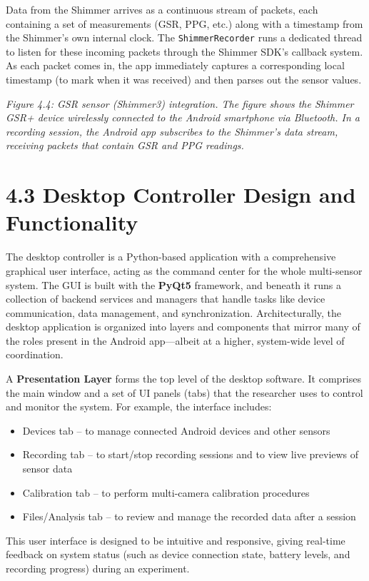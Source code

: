 Data from the Shimmer arrives as a continuous stream of packets, each containing a set of measurements (GSR, PPG, etc.) along with a timestamp from the Shimmer's own internal clock. The \texttt{ShimmerRecorder} runs a dedicated thread to listen for these incoming packets through the Shimmer SDK's callback system. As each packet comes in, the app immediately captures a corresponding local timestamp (to mark when it was received) and then parses out the sensor values.

\textit{Figure 4.4: GSR sensor (Shimmer3) integration. The figure shows the Shimmer GSR+ device wirelessly connected to the Android smartphone via Bluetooth. In a recording session, the Android app subscribes to the Shimmer's data stream, receiving packets that contain GSR and PPG readings.}

\section{4.3 Desktop Controller Design and Functionality}

The desktop controller is a Python-based application with a comprehensive graphical user interface, acting as the command center for the whole multi-sensor system. The GUI is built with the \textbf{PyQt5} framework, and beneath it runs a collection of backend services and managers that handle tasks like device communication, data management, and synchronization. Architecturally, the desktop application is organized into layers and components that mirror many of the roles present in the Android app—albeit at a higher, system-wide level of coordination.

A \textbf{Presentation Layer} forms the top level of the desktop software. It comprises the main window and a set of UI panels (tabs) that the researcher uses to control and monitor the system. For example, the interface includes:
\begin{itemize}
\item Devices tab – to manage connected Android devices and other sensors
\item Recording tab – to start/stop recording sessions and to view live previews of sensor data
\item Calibration tab – to perform multi-camera calibration procedures
\item Files/Analysis tab – to review and manage the recorded data after a session
\end{itemize}

This user interface is designed to be intuitive and responsive, giving real-time feedback on system status (such as device connection state, battery levels, and recording progress) during an experiment.

